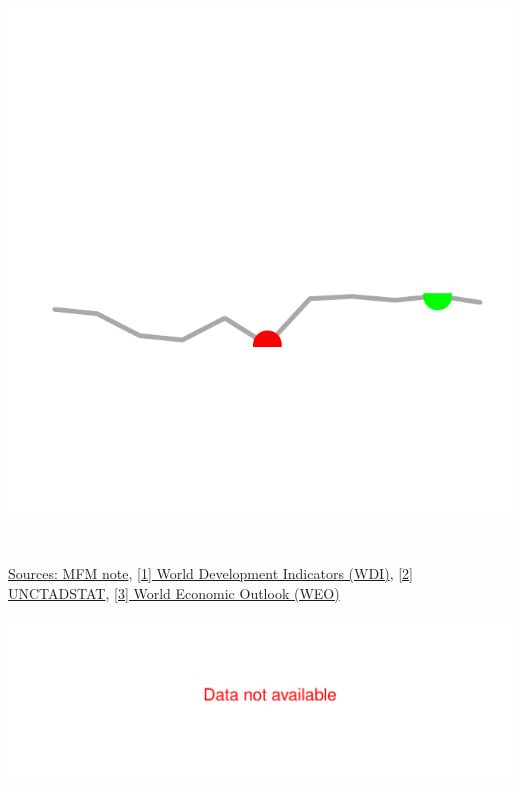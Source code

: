 \documentclass{article}\usepackage[]{graphicx}\usepackage[]{color}
\makeatletter
\def\maxwidth{ %
  \ifdim\Gin@nat@width>\linewidth
    \linewidth
  \else
    \Gin@nat@width
  \fi
}
\makeatother
\begin{document}
\begin{minipage}[b]{0.99\textwidth}
\begin{minipage}[t]{0.99\textwidth}
\begin{minipage}[c]{0.11\textwidth}
{\centering \includegraphics[width=\maxwidth]{figure/createSparklines_trade-1} 

}



      \vspace*{-0.4cm}
    \end{minipage}
  \\[3pt]
\raggedright{\footnotesize{\href{http://www.worldbank.org/en/topic/macroeconomics/overview}{Sources: MFM note}{,} \href{http://data.worldbank.org/data-catalog/world-development indicators}{[1] World Development Indicators (WDI)}{,} \href{http://unctadstat.unctad.org/wds/ReportFolders/reportFolders.aspx}{[2] UNCTADSTAT}{,} \href{https://www.imf.org/external/pubs/ft/weo/2015/02/weodata/index.aspx}{[3] World Economic Outlook (WEO)}}}
  \end{minipage} 
  \begin{minipage}[b]{\textwidth} %
  \vspace{+3ex}
    \begin{minipage}[c]{0.49\textwidth} %


{\centering \includegraphics[width=\maxwidth]{figure/ExpImp_HF-1} 

}
\end{minipage}
\end{minipage}
\end{minipage}
\end{document}
